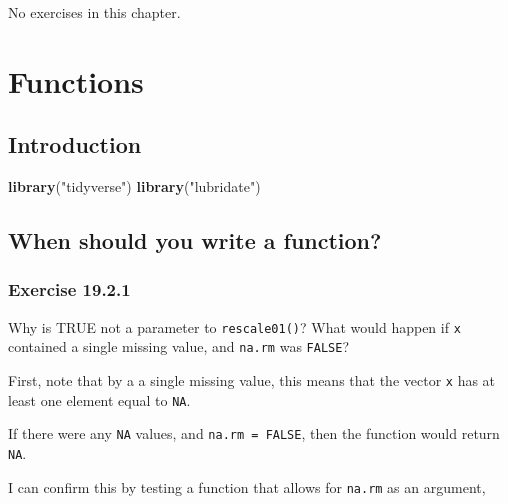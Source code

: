 \documentclass[]{book}
\newenvironment{Shaded}{\begin{snugshade}}{\end{snugshade}}
\newcommand{\KeywordTok}[1]{\textcolor[rgb]{0.13,0.29,0.53}{\textbf{#1}}}
\newcommand{\NormalTok}[1]{#1}
\newcommand{\StringTok}[1]{\textcolor[rgb]{0.31,0.60,0.02}{#1}}
\theoremstyle{plain}
\theoremstyle{remark}
\theoremstyle{definition}
\theoremstyle{definition}
\theoremstyle{definition}
\theoremstyle{remark}
\begin{document}
No exercises in this chapter.

\hypertarget{functions}{%
\chapter{Functions}\label{functions}}

\hypertarget{introduction-12}{%
\section{Introduction}\label{introduction-12}}

\begin{Shaded}
\begin{Highlighting}[]
\KeywordTok{library}\NormalTok{(}\StringTok{"tidyverse"}\NormalTok{)}
\KeywordTok{library}\NormalTok{(}\StringTok{"lubridate"}\NormalTok{)}
\end{Highlighting}
\end{Shaded}

\hypertarget{when-should-you-write-a-function}{%
\section{When should you write a
function?}\label{when-should-you-write-a-function}}

\hypertarget{exercise-19.2.1}{%
\subsection*{\texorpdfstring{Exercise
{19.2.1}}{Exercise 19.2.1}}\label{exercise-19.2.1}}

Why is TRUE not a parameter to \texttt{rescale01()}? What would happen
if \texttt{x} contained a single missing value, and \texttt{na.rm} was
\texttt{FALSE}?

First, note that by a a single missing value, this means that the vector
\texttt{x} has at least one element equal to \texttt{NA}.

If there were any \texttt{NA} values, and \texttt{na.rm\ =\ FALSE}, then
the function would return \texttt{NA}.

I can confirm this by testing a function that allows for \texttt{na.rm}
as an argument,
\end{document}
